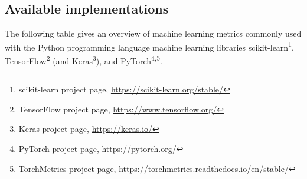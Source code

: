 \documentclass{article}
\begin{document}
\clearpage




\subsection{Available implementations}

The following table gives an overview of machine learning metrics commonly used with the Python programming language machine learning libraries scikit-learn\footnote{scikit-learn project page, \url{https://scikit-learn.org/stable/}}, TensorFlow\footnote{TensorFlow project page, \url{https://www.tensorflow.org/}} (and Keras\footnote{Keras project page, \url{https://keras.io/}}), and PyTorch\footnote{PyTorch project page, \url{https://pytorch.org/}}\textsuperscript{,}\footnote{TorchMetrics project page, \url{https://torchmetrics.readthedocs.io/en/stable/}}.
\end{document}
